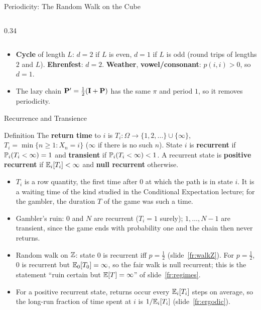 \begin{frame}{Periodicity: The Random Walk on the Cube}
\begin{columns}[T]
\begin{column}{0.34\textwidth}
    \end{column}
  \end{columns}
  \begin{itemize}
    \item \textbf{Cycle} of length $L$: $d=2$ if $L$ is even, $d=1$ if $L$ is odd (round trips of lengths $2$ and $L$). \textbf{Ehrenfest}: $d=2$. \textbf{Weather}, \textbf{vowel/consonant}: $p(i,i)>0$, so $d=1$.
    \item The lazy chain $\mathbf{P}'=\tfrac12(\mathbf I+\mathbf{P})$ has the same $\pi$ and period $1$, so it removes periodicity.
  \end{itemize}
\end{frame}


\begin{frame}{Recurrence and Transience}
  \label{fr:recurrence}
  \small
  \begin{block}{Definition}
    The \textbf{return time} to $i$ is $T_i\colon\Omega\to\{1,2,\dots\}\cup\{\infty\}$, $T_i=\min\{n\ge1 : X_n=i\}$ ($\infty$ if there is no such $n$). State $i$ is \textbf{recurrent} if $\mathbb{P}_i(T_i<\infty)=1$ and \textbf{transient} if $\mathbb{P}_i(T_i<\infty)<1$. A recurrent state is \textbf{positive recurrent} if $\mathbb{E}_i[T_i]<\infty$ and \textbf{null recurrent} otherwise.
  \end{block}
  \begin{itemize}
    \item $T_i$ is a row quantity, the first time after $0$ at which the path is in state $i$. It is a waiting time of the kind studied in the Conditional Expectation lecture; for the gambler, the duration $T$ of the game was such a time.
    \item Gambler's ruin: $0$ and $N$ are recurrent ($T_i=1$ surely); $1,\dots,N-1$ are transient, since the game ends with probability one and the chain then never returns.
    \item Random walk on $\mathbb{Z}$: state $0$ is recurrent iff $p=\tfrac12$ (slide~\ref{fr:walkZ}). For $p=\tfrac12$, $0$ is recurrent but $\mathbb{E}_0[T_0]=\infty$, so the fair walk is null recurrent; this is the statement ``ruin certain but $\mathbb{E}[T]=\infty$'' of slide~\ref{fr:regimes}.
    \item For a positive recurrent state, returns occur every $\mathbb{E}_i[T_i]$ steps on average, so the long-run fraction of time spent at $i$ is $1/\mathbb{E}_i[T_i]$ (slide~\ref{fr:ergodic}).
  \end{itemize}
\end{frame}

